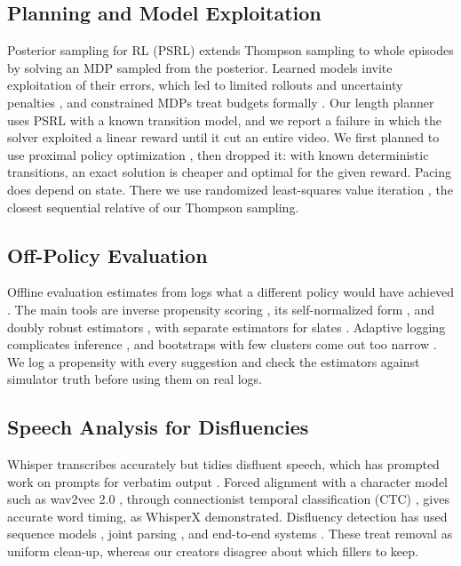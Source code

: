 \documentclass{ieeeaccess}
\begin{document}
\subsection{Planning and Model Exploitation}
Posterior sampling for RL (PSRL) \cite{osband2013} extends Thompson sampling to whole episodes by solving an MDP sampled from the posterior. Learned models invite exploitation of their errors, which led to limited rollouts \cite{janner2019} and uncertainty penalties \cite{yu2020}, and constrained MDPs treat budgets formally \cite{altman1999}. Our length planner uses PSRL with a known transition model, and we report a failure in which the solver exploited a linear reward until it cut an entire video. We first planned to use proximal policy optimization \cite{schulman2017}, then dropped it: with known deterministic transitions, an exact solution is cheaper and optimal for the given reward. Pacing does depend on state. There we use randomized least-squares value iteration \cite{osband2016,osband2019}, the closest sequential relative of our Thompson sampling.

\subsection{Off-Policy Evaluation}
Offline evaluation estimates from logs what a different policy would have achieved \cite{li2011,saito2021}. The main tools are inverse propensity scoring \cite{horvitz1952}, its self-normalized form \cite{swaminathan2015}, and doubly robust estimators \cite{dudik2011}, with separate estimators for slates \cite{swaminathan2017}. Adaptive logging complicates inference \cite{hadad2021}, and bootstraps with few clusters come out too narrow \cite{cameron2008}. We log a propensity with every suggestion and check the estimators against simulator truth before using them on real logs.

\subsection{Speech Analysis for Disfluencies}
Whisper \cite{radford2023} transcribes accurately but tidies disfluent speech, which has prompted work on prompts for verbatim output \cite{smith2025}. Forced alignment with a character model such as wav2vec 2.0 \cite{baevski2020}, through connectionist temporal classification (CTC) \cite{graves2006}, gives accurate word timing, as WhisperX \cite{bain2023} demonstrated. Disfluency detection has used sequence models \cite{zayats2016}, joint parsing \cite{honnibal2014}, and end-to-end systems \cite{lou2020}. These treat removal as uniform clean-up, whereas our creators disagree about which fillers to keep.
\end{document}
